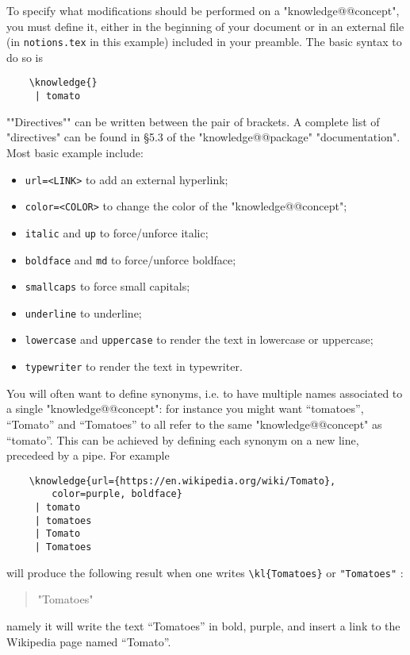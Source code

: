 \documentclass{article}
\begin{document}
To specify what modifications should be performed on a "knowledge@@concept", 
you must define it, either in the beginning of your document or in an external file (in \texttt{notions.tex} in this example) included in your preamble.
The basic syntax to do so is
\begin{verbatim}
    \knowledge{}
     | tomato
\end{verbatim}
\AP""Directives"" can be written between the pair of brackets. A complete list of "directives" can be found in §5.3 of the "knowledge@@package" "documentation". Most basic example include:
\begin{itemize}
    \item \verb|url=<LINK>| to add an external hyperlink;
    \item \verb|color=<COLOR>| to change the color of the "knowledge@@concept";
    \item \verb|italic| and \verb|up| to force/unforce italic;
    \item \verb|boldface| and \verb|md| to force/unforce boldface;
    \item \verb|smallcaps| to force small capitals;
    \item \verb|underline| to underline;
    \item \verb|lowercase| and \verb|uppercase| to render the text in lowercase or uppercase;
    \item \verb|typewriter| to render the text in typewriter.
\end{itemize}

You will often want to define synonyms, i.e. to have multiple names associated to a single "knowledge@@concept": for instance you might want ``tomatoes'', ``Tomato'' and  ``Tomatoes'' to all refer to the same "knowledge@@concept" as ``tomato''. This can be achieved by defining each synonym on a new line, precedeed by a pipe. For example
\begin{verbatim}
    \knowledge{url={https://en.wikipedia.org/wiki/Tomato},
        color=purple, boldface}
     | tomato
     | tomatoes
     | Tomato
     | Tomatoes
\end{verbatim}
will produce the following result when one writes \verb|\kl{Tomatoes}| or
%
\verb|"Tomatoes"|%
:%
\begin{quote}
    "Tomatoes"
\end{quote}
namely it will write the text ``Tomatoes'' in bold, purple, and insert a link to the Wikipedia page named ``Tomato''.
\end{document}
